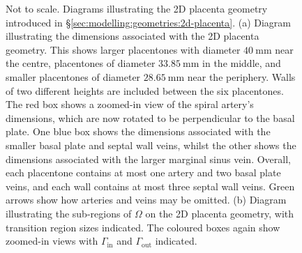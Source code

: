             \begin{figure}
                \begin{subfigure}[b]{\textwidth}
                    \centering
                    
                    \caption{}
                    \label{fig:inverted-circle-slice-6-flat:dimensions}
                \end{subfigure}
                \begin{subfigure}[b]{\textwidth}
                    \centering
                    
                    \caption{}
                    \label{fig:inverted-circle-slice-6-flat:regions}
                \end{subfigure}
                \caption{Not to scale. Diagrams illustrating the 2D placenta geometry introduced in \S\ref{sec:modelling:geometries:2d-placenta}. (a) Diagram illustrating the dimensions associated with the 2D placenta geometry. This shows larger placentones with diameter $\qty{40}{\milli\metre}$ near the centre, placentones of diameter $\qty{33.85}{\milli\metre}$ in the middle, and smaller placentones of diameter $\qty{28.65}{\milli\metre}$ near the periphery. Walls of two different heights are included between the six placentones. The red box shows a zoomed-in view of the spiral artery's dimensions, which are now rotated to be perpendicular to the basal plate. One blue box shows the dimensions associated with the smaller basal plate and septal wall veins, whilst the other shows the dimensions associated with the larger marginal sinus vein. Overall, each placentone contains at most one artery and two basal plate veins, and each wall contains at most three septal wall veins. Green arrows show how arteries and veins may be omitted. (b) Diagram illustrating the sub-regions of $\Omega$ on the 2D placenta geometry, with transition region sizes indicated. The coloured boxes again show zoomed-in views with $\Gamma_\text{in}$ and $\Gamma_\text{out}$ indicated.}
                \label{fig:inverted-circle-slice-6-flat}
            \end{figure}


